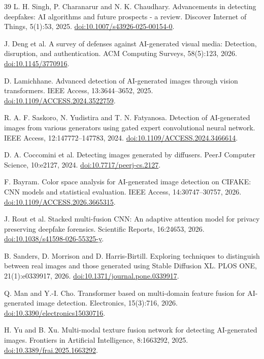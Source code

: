 \documentclass[11pt,a4paper]{article}
\begin{document}
\begin{thebibliography}{39}
 L. H. Singh, P. Charanarur and N. K. Chaudhary. Advancements in detecting deepfakes: AI algorithms and future prospects - a review. Discover Internet of Things, 5(1):53, 2025. \href{https://doi.org/10.1007/s43926-025-00154-0}{doi:10.1007/s43926-025-00154-0}.

 J. Deng et al. A survey of defenses against AI-generated visual media: Detection, disruption, and authentication. ACM Computing Surveys, 58(5):123, 2026. \href{https://doi.org/10.1145/3770916}{doi:10.1145/3770916}.

 D. Lamichhane. Advanced detection of AI-generated images through vision transformers. IEEE Access, 13:3644--3652, 2025. \href{https://doi.org/10.1109/ACCESS.2024.3522759}{doi:10.1109/ACCESS.2024.3522759}.

 R. A. F. Saskoro, N. Yudistira and T. N. Fatyanosa. Detection of AI-generated images from various generators using gated expert convolutional neural network. IEEE Access, 12:147772--147783, 2024. \href{https://doi.org/10.1109/ACCESS.2024.3466614}{doi:10.1109/ACCESS.2024.3466614}.

 D. A. Coccomini et al. Detecting images generated by diffusers. PeerJ Computer Science, 10:e2127, 2024. \href{https://doi.org/10.7717/peerj-cs.2127}{doi:10.7717/peerj-cs.2127}.

 F. Bayram. Color space analysis for AI-generated image detection on CIFAKE: CNN models and statistical evaluation. IEEE Access, 14:30747--30757, 2026. \href{https://doi.org/10.1109/ACCESS.2026.3665315}{doi:10.1109/ACCESS.2026.3665315}.

 J. Rout et al. Stacked multi-fusion CNN: An adaptive attention model for privacy preserving deepfake forensics. Scientific Reports, 16:24653, 2026. \href{https://doi.org/10.1038/s41598-026-55325-y}{doi:10.1038/s41598-026-55325-y}.

 B. Sanders, D. Morrison and D. Harris-Birtill. Exploring techniques to distinguish between real images and those generated using Stable Diffusion XL. PLOS ONE, 21(1):e0339917, 2026. \href{https://doi.org/10.1371/journal.pone.0339917}{doi:10.1371/journal.pone.0339917}.

 Q. Man and Y.-I. Cho. Transformer based on multi-domain feature fusion for AI-generated image detection. Electronics, 15(3):716, 2026. \href{https://doi.org/10.3390/electronics15030716}{doi:10.3390/electronics15030716}.

 H. Yu and B. Xu. Multi-modal texture fusion network for detecting AI-generated images. Frontiers in Artificial Intelligence, 8:1663292, 2025. \href{https://doi.org/10.3389/frai.2025.1663292}{doi:10.3389/frai.2025.1663292}.


\end{thebibliography}
\end{document}
